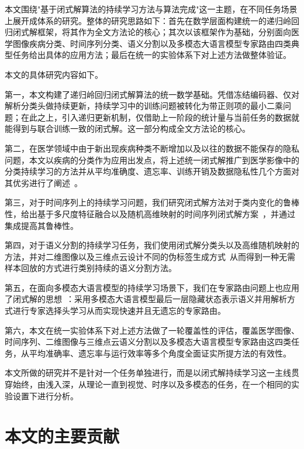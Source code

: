 本文围绕"基于闭式解算法的持续学习方法与算法完成"这一主题，在不同任务场景上展开成体系的研究。整体的研究思路如下：首先在数学层面构建统一的递归岭回归闭式解框架，将其作为全文方法论的核心；其次以该框架作为基础，分别面向医学图像疾病分类、时间序列分类、语义分割以及多模态大语言模型专家路由四类典型任务给出具体的应用方法；最后在统一的实验体系下对上述方法做整体验证。

本文的具体研究内容如下。

第一，本文构建了递归岭回归闭式解算法的统一数学基础。凭借冻结编码器、仅对解析分类头做持续更新，持续学习中的训练问题被转化为带正则项的最小二乘问题；在此之上，引入递归更新机制，仅借助上一阶段的统计量与当前任务的数据就能得到与联合训练一致的闭式解。这一部分构成全文方法论的核心。

第二，在医学领域中由于新出现疾病种类不断增加以及以往的数据不能保存的隐私问题，本文以疾病的分类作为应用出发点，将上述统一闭式解推广到医学影像中的分类持续学习的方法并从平均准确度、遗忘率、训练开销及数据隐私性几个方面对其优劣进行了阐述~\citep{yang2023medmnist,derakhshani2022lifelonger,sun2023few}。

第三，对于时间序列上的持续学习问题，我们研究闭式解方法对于类内变化的鲁棒性，给出基于多尺度特征融合以及随机高维映射的时间序列闭式解方案~\citep{qiao2024tscil,qiao2023dt2w,huo2025continue}，并通过集成提高其鲁棒性。

第四，对于语义分割的持续学习任务，我们使用闭式解分类头以及高维随机映射的方法，并对二维图像以及三维点云设计不同的伪标签生成方式~\citep{cermelli2020mib,douillard2021plop,chen2017deeplabv3,wang2019dgcnn}从而得到一种无需样本回放的方式进行类别持续的语义分割方法。

第五，在面向多模态大语言模型的持续学习场景下，我们在专家路由问题上也应用了闭式解的思想~\citep{zhao2025mllm, hu2021lora, wang2023orthogonal, chen2024coin, liu2023llava, chen2024internvl}：采用多模态大语言模型最后一层隐藏状态表示语义并用解析方式进行专家选择头学习从而实现快速并且无遗忘的专家路由。

第六，本文在统一实验体系下对上述方法做了一轮覆盖性的评估，覆盖医学图像、时间序列、二维图像与三维点云语义分割以及多模态大语言模型专家路由这四类任务，从平均准确率、遗忘率与运行效率等多个角度全面证实所提方法的有效性。

本文所做的研究并不是针对一个任务单独进行，而是以闭式解持续学习这一主线贯穿始终，由浅入深，从理论一直到视觉、时序以及多模态的任务，在一个相同的实验设置下进行分析。

\section{本文的主要贡献}

